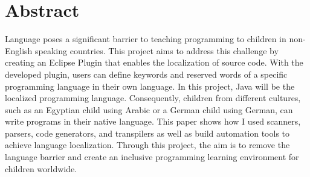 \chapter*{Abstract}
\label{chap:abstract}
Language poses a significant barrier to teaching programming to children in non-English speaking countries. This project aims to address this challenge by creating an Eclipse Plugin that enables the localization of source code. With the developed plugin, users can define keywords and reserved words of a specific programming language in their own language. In this project, Java will be the localized programming language. Consequently, children from different cultures, such as an Egyptian child using Arabic or a German child using German, can write programs in their native language. This paper shows how I used scanners, parsers, code generators, and transpilers as well as build automation tools to achieve language localization. Through this project, the aim is to remove the language barrier and create an inclusive programming learning environment for children worldwide.

